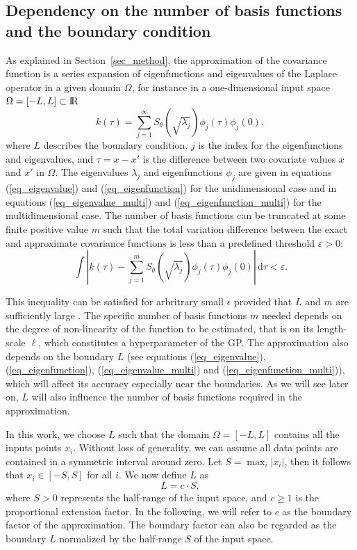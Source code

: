 \subsection{Dependency on the number of basis functions and the boundary condition} \label{subsec_dependency}

As explained in Section~\ref{sec_method}, the approximation of the covariance function is a series expansion of eigenfunctions and eigenvalues of the Laplace operator in a given domain $\Omega$, for instance in a one-dimensional input space $\Omega=[-L,L]\subset {\rm I\!R}$
%
\begin{equation*}
k(\tau) = \sum_{j=1}^{\infty} S_{\theta}(\sqrt{\lambda_j}) \phi_j(\tau) \phi_j(0), 
\end{equation*}
%
where $L$ describes the boundary condition, $j$ is the index for the eigenfunctions and eigenvalues, and $\tau=x-x'$ is the difference between two covariate values $x$ and $x'$ in $\Omega$. The eigenvalues $\lambda_j$ and eigenfunctions $\phi_j$ are given in equations (\ref{eq_eigenvalue}) and (\ref{eq_eigenfunction}) for the unidimensional case and in equations (\ref{eq_eigenvalue_multi}) and (\ref{eq_eigenfunction_multi}) for the multidimensional case. The number of basis functions can be truncated at some finite positive value $m$ such that the total variation difference between the exact and approximate covariance functions is less than a predefined threshold $\varepsilon > 0$:
%
\begin{equation}\label{eq_diff_covs}
 \int | k(\tau) - \sum_{j=1}^m S_{\theta}(\sqrt{\lambda_j}) \phi_j(\tau) \phi_j(0)|  \,\mathrm{d}\tau  < \varepsilon.
\end{equation}

This inequality can be satisfied for arbritrary small $\epsilon$ provided that $L$ and $m$ are sufficiently large \cite[Theorem 1 and 4]{solin2018hilbert}. 
The specific number of basis functions $m$ needed depends on the degree of non-linearity of the function to be estimated, that is on its length-scale $\ell$, which constitutes a hyperparameter of the GP. The approximation also depends on the boundary $L$ (see equations (\ref{eq_eigenvalue}), (\ref{eq_eigenfunction}), (\ref{eq_eigenvalue_multi}) and (\ref{eq_eigenfunction_multi})), which will affect its accuracy especially near the boundaries. As we will see later on, $L$ will also influence the number of basis functions required in the approximation.

In this work, we choose $L$ such that the domain $\Omega = \left[-L, L\right]$ contains all the inputs points $x_i$. Without loss of generality, we can assume all data points are contained in a symmetric interval around zero. Let $S = \max_{i}|x_i|$, then it follows that $x_i \in \left[-S, S\right]$ for all $i$. We now define $L$ as
\begin{equation}\label{eq_boundary}
L=c \cdot S,
\end{equation} 
%
where $S > 0$ represents the half-range of the input space, and $c \geq 1$ is the proportional extension factor. In the following, we will refer to $c$ as the boundary factor of the approximation. The boundary factor can also be regarded as the boundary $L$ normalized by the half-range $S$ of the input space.

